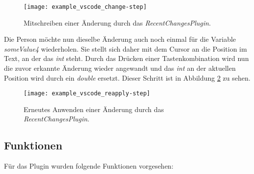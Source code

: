 \begin{figure}
    \centering
    \texttt{[image: example\_vscode\_change-step]}
    \caption{Mitschreiben einer Änderung durch das \emph{RecentChangesPlugin}.}
    \label{fig:example_vscode_change-step}
\end{figure}

Die Person möchte nun dieselbe Änderung auch noch einmal für
die Variable \emph{someValue4} wiederholen. Sie stellt sich daher
mit dem Cursor an die Position im Text, an der das \emph{int} steht.
Durch das Drücken einer Tastenkombination wird nun die zuvor erkannte
Änderung wieder angewandt und das \emph{int} an der aktuellen Position
wird durch ein \emph{double} ersetzt. Dieser Schritt
ist in Abbildung \ref{fig:example_vscode_reapply-step} zu sehen.

\begin{figure}
    \centering
    \texttt{[image: example\_vscode\_reapply-step]}
    \caption{Erneutes Anwenden einer Änderung durch das \emph{RecentChangesPlugin}.}
    \label{fig:example_vscode_reapply-step}
\end{figure}

\subsection{Funktionen}

Für das Plugin wurden folgende Funktionen vorgesehen:


